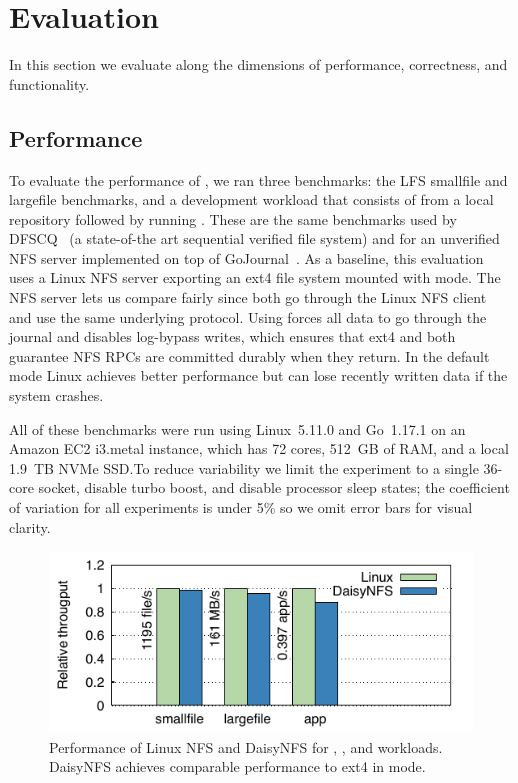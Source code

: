 \section{Evaluation}
\label{sec:eval}

In this section we evaluate \sys along the dimensions of performance,
correctness, and functionality.

\subsection{Performance}
\label{sec:eval:bench}

To evaluate the performance of \sys, we ran three benchmarks: the LFS smallfile
and largefile benchmarks, and a development workload that consists of  from a local repository followed by running . These are the same
benchmarks used by DFSCQ~\cite{chen:dfscq} (a state-of-the art sequential
verified file system) and for an unverified NFS server implemented on top of
GoJournal~\cite{chajed:gojournal}. As a baseline, this evaluation uses a Linux
NFS server exporting an ext4 file system mounted with  mode.
The NFS server lets us compare fairly since both go through the Linux NFS client
and use the same underlying protocol. Using  forces all data to
go through the journal and disables log-bypass writes, which ensures that
ext4 and \sys both guarantee NFS RPCs are committed durably when they return. In
the default  mode Linux achieves better performance but can
lose recently written data if the system crashes.

All of these benchmarks were run using Linux~5.11.0 and Go~1.17.1 on an Amazon
EC2 i3.metal instance, which has 72 cores, 512~GB of RAM, and a local 1.9~TB
NVMe SSD.\@ To reduce variability we limit the experiment to a single 36-core
socket, disable turbo boost, and disable processor sleep states; the coefficient
of variation for all experiments is under 5\% so we omit error bars for visual
clarity.



\begin{figure}
  \includegraphics{daisy-nfs/fig/bench.pdf}
  \caption{Performance of Linux NFS and DaisyNFS for ,
    , and  workloads. DaisyNFS achieves comparable
    performance to ext4 in  mode.}
  \label{fig:eval:bench}
\end{figure}

